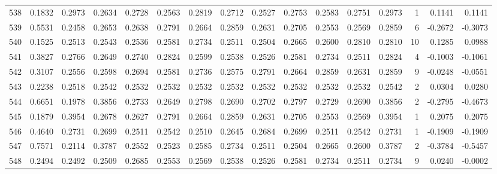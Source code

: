 \begin{tabular}{lrrrrrrrrrrrrrrr}
538 &      0.1832 &  0.2973 &  0.2634 &  0.2728 &  0.2563 &  0.2819 &  0.2712 &  0.2527 &  0.2753 &  0.2583 &   0.2751 &     0.2973 &      1 &                    0.1141 &                     0.1141 \\
539 &      0.5531 &  0.2458 &  0.2653 &  0.2638 &  0.2791 &  0.2664 &  0.2859 &  0.2631 &  0.2705 &  0.2553 &   0.2569 &     0.2859 &      6 &                   -0.2672 &                    -0.3073 \\
540 &      0.1525 &  0.2513 &  0.2543 &  0.2536 &  0.2581 &  0.2734 &  0.2511 &  0.2504 &  0.2665 &  0.2600 &   0.2810 &     0.2810 &     10 &                    0.1285 &                     0.0988 \\
541 &      0.3827 &  0.2766 &  0.2649 &  0.2740 &  0.2824 &  0.2599 &  0.2538 &  0.2526 &  0.2581 &  0.2734 &   0.2511 &     0.2824 &      4 &                   -0.1003 &                    -0.1061 \\
542 &      0.3107 &  0.2556 &  0.2598 &  0.2694 &  0.2581 &  0.2736 &  0.2575 &  0.2791 &  0.2664 &  0.2859 &   0.2631 &     0.2859 &      9 &                   -0.0248 &                    -0.0551 \\
543 &      0.2238 &  0.2518 &  0.2542 &  0.2532 &  0.2532 &  0.2532 &  0.2532 &  0.2532 &  0.2532 &  0.2532 &   0.2532 &     0.2542 &      2 &                    0.0304 &                     0.0280 \\
544 &      0.6651 &  0.1978 &  0.3856 &  0.2733 &  0.2649 &  0.2798 &  0.2690 &  0.2702 &  0.2797 &  0.2729 &   0.2690 &     0.3856 &      2 &                   -0.2795 &                    -0.4673 \\
545 &      0.1879 &  0.3954 &  0.2678 &  0.2627 &  0.2791 &  0.2664 &  0.2859 &  0.2631 &  0.2705 &  0.2553 &   0.2569 &     0.3954 &      1 &                    0.2075 &                     0.2075 \\
546 &      0.4640 &  0.2731 &  0.2699 &  0.2511 &  0.2542 &  0.2510 &  0.2645 &  0.2684 &  0.2699 &  0.2511 &   0.2542 &     0.2731 &      1 &                   -0.1909 &                    -0.1909 \\
547 &      0.7571 &  0.2114 &  0.3787 &  0.2552 &  0.2523 &  0.2585 &  0.2734 &  0.2511 &  0.2504 &  0.2665 &   0.2600 &     0.3787 &      2 &                   -0.3784 &                    -0.5457 \\
548 &      0.2494 &  0.2492 &  0.2509 &  0.2685 &  0.2553 &  0.2569 &  0.2538 &  0.2526 &  0.2581 &  0.2734 &   0.2511 &     0.2734 &      9 &                    0.0240 &                    -0.0002 \\

\end{tabular}
